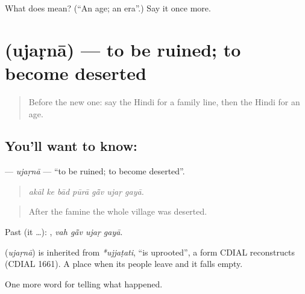 \begin{tcolorbox}[breakable,colback=teal!4,colframe=teal!35!black,title={Before you move on}]
What does  mean? (\textquotedblleft{}An age; an era\textquotedblright{}.) Say it once more.
\end{tcolorbox}
\section[\texorpdfstring{\hi{उजड़ना} (ujaṛnā)}{उजड़ना (ujaṛnā)}]{ (ujaṛnā) — to be ruined; to become deserted}

\label{lesson:HI-C327-ujarna}



\begin{quote}
Before the new one: say the Hindi for a family line, then the Hindi for an age.
\end{quote}

\subsection*{You'll want to know: }
\textbf{} — \emph{ujaṛnā} — \textquotedblleft{}to be ruined; to become deserted\textquotedblright{}.

\begin{quote}
      
\end{quote}

\begin{quote}
\emph{akāl ke bād pūrā gā̃v ujaṛ gayā.}
\end{quote}

\begin{quote}
After the famine the whole village was deserted.
\end{quote}

Past (it …):    , \emph{vah gā̃v ujaṛ gayā}.

\begin{cousinweb}
\textbf{} (\emph{ujaṛnā}) is inherited from \emph{*ujjaṭati}, \textquotedblleft{}is uprooted\textquotedblright{}, a form CDIAL reconstructs (CDIAL 1661). A place \textbf{ } when its people leave and it falls empty.
\end{cousinweb}

\begin{grammarlens}[title={What you've built}]
One more word for telling what happened.
\end{grammarlens}

